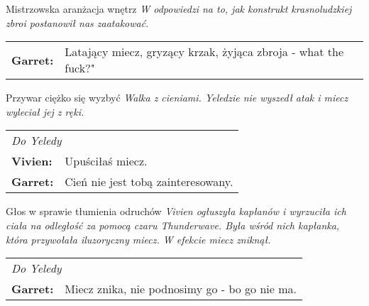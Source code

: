 \documentclass[10pt,twoside,twocolumn]{book}
\begin{document}
\begin{rpg-quotebox}{Mistrzowska aranżacja wnętrz}
   \textit{W odpowiedzi na to, jak konstrukt krasnoludzkiej zbroi postanowił nas zaatakować.}\\
   
   \begin{tabularx}{\columnwidth}{lX}
      \textbf{Garret:} & Latający miecz, gryzący krzak, żyjąca zbroja - what the fuck?"\\
   \end{tabularx}
\end{rpg-quotebox}


\begin{rpg-quotebox}{Przywar ciężko się wyzbyć}
   \textit{Walka z cieniami. Yeledzie nie wyszedł atak i miecz wyleciał jej z ręki.}\\
   
   \begin{tabularx}{\columnwidth}{lX}
      \multicolumn{2}{l}{\textit{Do Yeledy}}\\
      
      \textbf{Vivien:} & Upuściłaś miecz.\\
      \textbf{Garret:} & Cień nie jest tobą zainteresowany.\\
   \end{tabularx}
\end{rpg-quotebox}


\begin{rpg-quotebox}{Głos w sprawie tłumienia odruchów}
   \textit{Vivien ogłuszyła kapłanów i wyrzuciła ich ciała na odległość za pomocą czaru Thunderwave. Była wśród nich kapłanka, która przywołała iluzoryczny miecz. W efekcie miecz zniknął.}\\
   
   \begin{tabularx}{\columnwidth}{lX}
      \multicolumn{2}{l}{\textit{Do Yeledy}}\\
      
      \textbf{Garret:} & Miecz znika, nie podnosimy go - bo go nie ma.\\
   \end{tabularx}
\end{rpg-quotebox}
\end{document}
